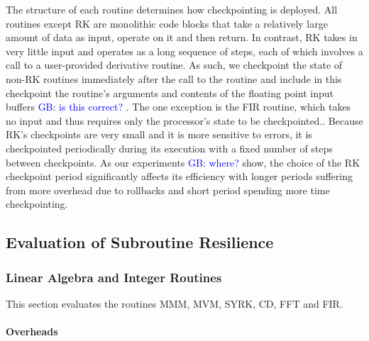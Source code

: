 \documentclass{sig-alternate}
\newcommand{\greg}[1]{%
  \textcolor{blue}{GB: #1}
}
\begin{document}
The structure of each routine determines how checkpointing is deployed.
All routines except RK are monolithic code blocks that take a relatively large amount of data as input, operate on it and then return.
In contrast, RK takes in very little input and operates as a long sequence of steps, each of which involves a call to a user-provided derivative routine.
As such, we checkpoint the state of non-RK routines immediately after the call to the routine and include in this checkpoint the routine's arguments and contents of the floating point input buffers \greg{is this correct?}.
The one exception is the FIR routine, which takes no input and thus requires only the processor's state to be checkpointed..
Because RK's checkpoints are very small and it is more sensitive to errors, it is checkpointed periodically during its execution with a fixed number of steps between checkpoints.
As our experiments \greg{where?} show, the choice of the RK checkpoint period significantly affects its efficiency with longer periods suffering from more overhead due to rollbacks and short period spending more time checkpointing.

\subsection{Evaluation of Subroutine Resilience}
\label{sec:res_tech:eval}

\subsubsection{Linear Algebra and Integer Routines}
\label{sec:res_tech:eval:la_int}

This section evaluates the routines MMM, MVM, SYRK, CD, FFT and FIR.

\paragraph{Overheads}
\end{document}
